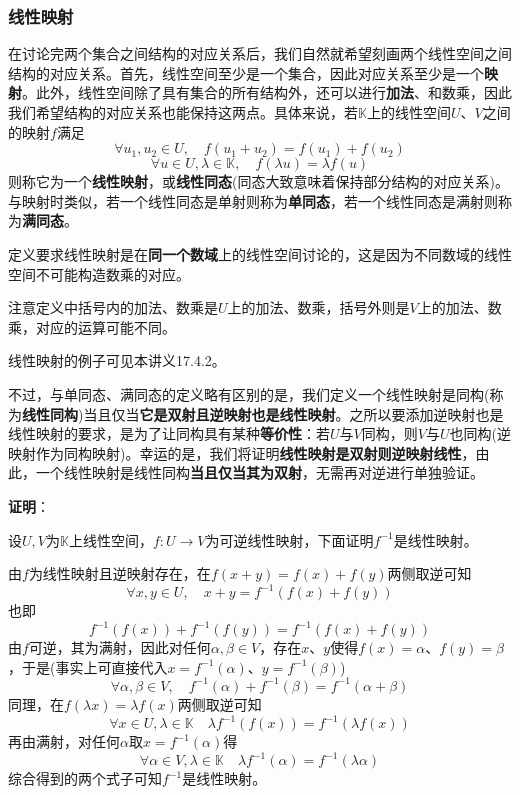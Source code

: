 \documentclass[a4paper,UTF8,fontset=windows,AutoFakeBold]{ctexart}
\newcommand{\proo}[1]{{\vspace{5pt}\kaishu\noindent\textbf{证明}：\vspace{-3pt}
\begin{compactitem}
    \item[] #1
\end{compactitem}
}}
\begin{document}
\subsubsection{线性映射}
在讨论完两个集合之间结构的对应关系后，我们自然就希望刻画两个线性空间之间结构的对应关系。首先，线性空间至少是一个集合，因此对应关系至少是一个\textbf{映射}。此外，线性空间除了具有集合的所有结构外，还可以进行\textbf{加法}、和数乘，因此我们希望结构的对应关系也能保持这两点。具体来说，若$\mathbb{K}$上的线性空间$U$、$V$之间的映射$f$满足
$$\forall u_1,u_2\in U,\quad f(u_1+u_2)=f(u_1)+f(u_2)$$
$$\forall u\in U,\lambda\in\mathbb{K},\quad f(\lambda u)=\lambda f(u)$$
则称它为一个\textbf{线性映射}，或\textbf{线性同态}(同态大致意味着保持部分结构的对应关系)。与映射时类似，若一个线性同态是单射则称为\textbf{单同态}，若一个线性同态是满射则称为\textbf{满同态}。

\begin{compactitem}
    \item 定义要求线性映射是在\textbf{同一个数域}上的线性空间讨论的，这是因为不同数域的线性空间不可能构造数乘的对应。
    \item 注意定义中括号内的加法、数乘是$U$上的加法、数乘，括号外则是$V$上的加法、数乘，对应的运算可能不同。
    \item 线性映射的例子可见本讲义17.4.2。
\end{compactitem}

不过，与单同态、满同态的定义略有区别的是，我们定义一个线性映射是同构(称为\textbf{线性同构})当且仅当\textbf{它是双射且逆映射也是线性映射}。之所以要添加逆映射也是线性映射的要求，是为了让同构具有某种\textbf{等价性}：若$U$与$V$同构，则$V$与$U$也同构(逆映射作为同构映射)。幸运的是，我们将证明\textbf{线性映射是双射则逆映射线性}，由此，一个线性映射是线性同构\textbf{当且仅当其为双射}，无需再对逆进行单独验证。

\proo{
    设$U,V$为$\mathbb{K}$上线性空间，$f:U\to V$为可逆线性映射，下面证明$f^{-1}$是线性映射。    

    由$f$为线性映射且逆映射存在，在$f(x+y)=f(x)+f(y)$两侧取逆可知
    $$\forall x,y\in U,\quad x+y=f^{-1}(f(x)+f(y))$$
    也即
    $$f^{-1}(f(x))+f^{-1}(f(y))=f^{-1}(f(x)+f(y))$$
    由$f$可逆，其为满射，因此对任何$\alpha,\beta\in V$，存在$x$、$y$使得$f(x)=\alpha$、$f(y)=\beta$，于是(事实上可直接代入$x=f^{-1}(\alpha)$、$y=f^{-1}(\beta)$)
    $$\forall \alpha,\beta\in V,\quad f^{-1}(\alpha)+f^{-1}(\beta)=f^{-1}(\alpha+\beta)$$
    同理，在$f(\lambda x)=\lambda f(x)$两侧取逆可知
    $$\forall x\in U,\lambda\in\mathbb{K}\quad \lambda f^{-1}(f(x))=f^{-1}(\lambda f(x))$$
    再由满射，对任何$\alpha$取$x=f^{-1}(\alpha)$得
    $$\forall\alpha\in V,\lambda\in\mathbb{K}\quad\lambda f^{-1}(\alpha)=f^{-1}(\lambda\alpha)$$
    综合得到的两个式子可知$f^{-1}$是线性映射。
}
\end{document}
